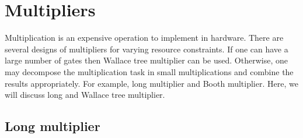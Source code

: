 \section{Multipliers}

Multiplication is an expensive operation to implement in hardware.
%
There are several designs of multipliers for varying
resource constraints.
%
If one can have a large number of gates then Wallace tree
multiplier can be used.
%
Otherwise, one may decompose the multiplication task in
small multiplications and combine the results appropriately.
%
For example, long multiplier and Booth multiplier.
%
Here, we will discuss long and Wallace tree multiplier.

\subsection{Long multiplier}\label{sec:long-mult}

